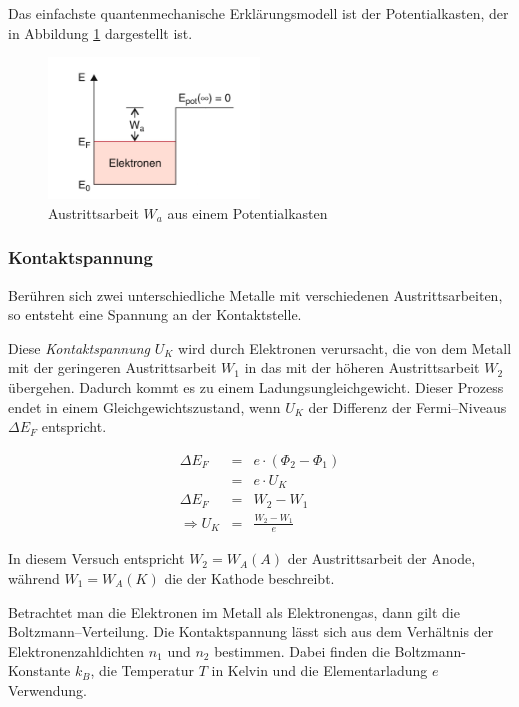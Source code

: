 \documentclass[12pt,a4paper]{scrartcl}
\numberwithin{equation}{section} %
\begin{document}
\noindent
Das einfachste quantenmechanische Erklärungsmodell ist der Potentialkasten, der in Abbildung \ref{fig:Austrittsarbeit} dargestellt ist.

\begin{figure}[h!]
	\centering
	\includegraphics[width=0.5\textwidth]{../media/B1.4/Austrittsarbeit_Potentialkasten.jpg}
	\caption{Austrittsarbeit $W_a$ aus einem Potentialkasten \cite{Demtröder}}
	\label{fig:Austrittsarbeit}
\end{figure}

\subsubsection{Kontaktspannung}
Berühren sich zwei unterschiedliche Metalle mit verschiedenen Austrittsarbeiten, so entsteht eine Spannung an der Kontaktstelle.

Diese \emph{Kontaktspannung} $U_K$ wird durch Elektronen verursacht, die von dem Metall mit der geringeren Austrittsarbeit $W_1$ in das mit der höheren Austrittsarbeit $W_2$ übergehen. Dadurch kommt es zu einem Ladungsungleichgewicht. Dieser Prozess endet in einem Gleichgewichtszustand, wenn $U_K$ der Differenz der Fermi--Niveaus $\Delta E_F$ entspricht.

\begin{eqnarray}
	\Delta E_F &=& e \cdot (\Phi _2 - \Phi _1) \\
		&=& e \cdot U_K \\
	\Delta E_F &=& W_2 - W_1 \\
	\Rightarrow U_K &=& \frac{W_2 -W_1}{e}
\end{eqnarray}

\noindent
In diesem Versuch entspricht $W_2=W_A(A)$ der Austrittsarbeit der Anode, während $W_1=W_A(K)$ die der Kathode beschreibt.

Betrachtet man die Elektronen im Metall als Elektronengas, dann gilt die Boltzmann--Verteilung. Die Kontaktspannung lässt sich aus dem Verhältnis der Elektronenzahldichten $n_1$ und $n_2$ bestimmen. Dabei finden die Boltzmann-Konstante $k_B$, die Temperatur $T$ in Kelvin und die Elementarladung $e$ Verwendung.
\end{document}
